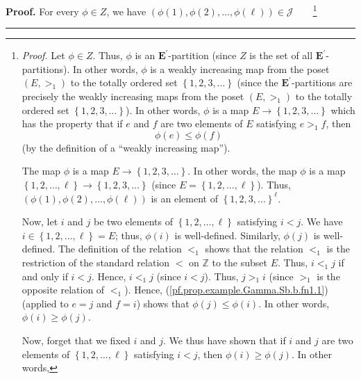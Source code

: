 \documentclass[numbers=enddot,12pt,final,onecolumn,notitlepage,abstracton]{scrartcl}
\theoremstyle{definition}
\newenvironment{proof}[1][Proof]{\noindent\textbf{#1.} }{\ \rule{0.5em}{0.5em}}
\newenvironment{verlong}{}{}
\begin{document}
\begin{verlong}
\begin{footnotesize}
\begin{proof}
For every $\phi\in Z$, we have $\left(  \phi\left(  1\right)  ,\phi\left(
2\right)  ,\ldots,\phi\left(  \ell\right)  \right)  \in\mathcal{J}%
$\ \ \ \ \footnote{\textit{Proof.} Let $\phi\in Z$. Thus, $\phi$ is an
$\mathbf{E}^{\prime}$-partition (since $Z$ is the set of all $\mathbf{E}%
^{\prime}$-partitions). In other words, $\phi$ is a weakly increasing map from
the poset $\left(  E,>_{1}\right)  $ to the totally ordered set $\left\{
1,2,3,\ldots\right\}  $ (since the $\mathbf{E}^{\prime}$-partitions are
precisely the weakly increasing maps from the poset $\left(  E,>_{1}\right)  $
to the totally ordered set $\left\{  1,2,3,\ldots\right\}  $). In other words,
$\phi$ is a map $E\rightarrow\left\{  1,2,3,\ldots\right\}  $ which has the
property that if $e$ and $f$ are two elements of $E$ satisfying $e>_{1}f$,
then%
\begin{equation}
\phi\left(  e\right)  \leq\phi\left(  f\right)
\label{pf.prop.example.Gamma.Sb.b.fn1.1}%
\end{equation}
(by the definition of a \textquotedblleft weakly increasing
map\textquotedblright).
\par
The map $\phi$ is a map $E\rightarrow\left\{  1,2,3,\ldots\right\}  $. In
other words, the map $\phi$ is a map $\left\{  1,2,\ldots,\ell\right\}
\rightarrow\left\{  1,2,3,\ldots\right\}  $ (since $E=\left\{  1,2,\ldots
,\ell\right\}  $). Thus, $\left(  \phi\left(  1\right)  ,\phi\left(  2\right)
,\ldots,\phi\left(  \ell\right)  \right)  $ is an element of $\left\{
1,2,3,\ldots\right\}  ^{\ell}$.
\par
Now, let $i$ and $j$ be two elements of $\left\{  1,2,\ldots,\ell\right\}  $
satisfying $i<j$. We have $i\in\left\{  1,2,\ldots,\ell\right\}  =E$; thus,
$\phi\left(  i\right)  $ is well-defined. Similarly, $\phi\left(  j\right)  $
is well-defined. The definition of the relation $<_{1}$ shows that the
relation $<_{1}$ is the restriction of the standard relation $<$ on
$\mathbb{Z}$ to the subset $E$. Thus, $i<_{1}j$ if and only if $i<j$. Hence,
$i<_{1}j$ (since $i<j$). Thus, $j>_{1}i$ (since $>_{1}$ is the opposite
relation of $<_{1}$). Hence, (\ref{pf.prop.example.Gamma.Sb.b.fn1.1}) (applied
to $e=j$ and $f=i$) shows that $\phi\left(  j\right)  \leq\phi\left(
i\right)  $. In other words, $\phi\left(  i\right)  \geq\phi\left(  j\right)
$.
\par
Now, forget that we fixed $i$ and $j$. We thus have shown that if $i$ and $j$
are two elements of $\left\{  1,2,\ldots,\ell\right\}  $ satisfying $i<j$,
then $\phi\left(  i\right)  \geq\phi\left(  j\right)  $. In other words,
}
\end{proof}
\end{footnotesize}
\end{verlong}
\end{document}
